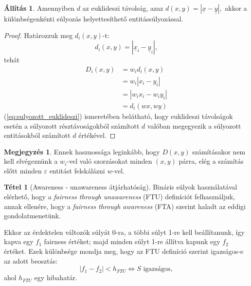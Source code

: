 \documentclass[twocolumn]{article}
\theoremstyle{definition}
\newtheorem{theorem}{Tétel}[section]
\newtheorem{allitas}{Állítás}[section]
\newtheorem*{megj}{Megjegyzés}
\newcommand{\vect}[1]{ \underline{#1} }
\begin{document}
    \begin{allitas}
        Amennyiben $d$ az euklideszi távolság, azaz $d(x,y) = |\vect x - \vect y|,$ akkor a különbségenkénti súlyozás helyettesíthető entitássúlyozással.
        \begin{proof}
            Határozzuk meg $d_i(x, y)$-t:
            \begin{equation}
                d_i(x,y) = |\vect x_i - \vect y_i|,
            \end{equation}
            tehát
            \begin{equation}
            \begin{split}
                D_i(x, y) &= w_i d_i(x, y) \\
                &= w_i |x_i - y_i| \\
                &= |w_i x_i - w_i y_i| \\
                &= d_i(wx, wy)
            \end{split}
            \end{equation}
            (\ref{eq:sulyozott_euklideszi}) ismeretében belátható, hogy euklideszi távolságok esetén a súlyozott résztávoságokból számított $d$ valóban megegyezik a súlyozott entitásokból számított $d$ értékével.
        \end{proof}
        \begin{megj}
            Ennek hasznossága leginkább, hogy $D(x, y)$ számításakor nem kell elvégeznünk a $w_i$-vel való szorzásokat minden $(x,y)$ párra, elég a számítás előtt minden $\varepsilon$ entitást felskálázni $w$-vel.
        \end{megj}
    \end{allitas}
    
    \begin{theorem}[Awareness - unawareness átjárhatóság]
        Bináris súlyok használatával elérhető, hogy a \textit{fairness through unawareness} (FTU) definíciót felhasználjuk, annak ellenére, hogy a \textit{fairness through awareness} (FTA) szerint haladt az eddigi gondolatmenetünk. 
        
        Ekkor az érdektelen változók súlyát 0-ra, a többi súlyt 1-re kell beállítanunk, így kapva egy $f_1$ fairness értéket; majd minden súlyt 1-re állítva kapunk egy $f_2$ értéket. Ezek különbsége mondja meg, hogy az FTU definíció szerint igazságos-e az adott beosztás:
        $$ |f_1 - f_2| < h_{FTU} \Leftrightarrow S \text{ igazságos}, $$
        ahol $h_{FTU}$ egy hibahatár.
    \end{theorem}
    
\end{document}
